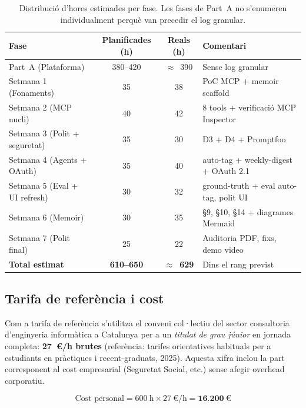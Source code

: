 \begin{table}[H]
    \centerfloat
    \footnotesize
    \caption{Distribució d'hores estimades per fase. Les fases de Part~A no s'enumeren individualment perquè van precedir el log granular.}
    \label{tab:hores-fases}
    \begin{tabular}{@{}lccl@{}}
        \toprule
        Fase & Planificades (h) & Reals (h) & Comentari \\
        \midrule
        Part~A (Plataforma) & 380--420 & $\approx$~390 & Sense log granular \\
        Setmana 1 (Fonaments) & 35 & 38 & PoC MCP + memoir scaffold \\
        Setmana 2 (MCP nucli) & 40 & 42 & 8 tools + verificació MCP Inspector \\
        Setmana 3 (Polit + seguretat) & 35 & 30 & D3 + D4 + Promptfoo \\
        Setmana 4 (Agents + OAuth) & 35 & 40 & auto-tag + weekly-digest + OAuth 2.1 \\
        Setmana 5 (Eval + UI refresh) & 30 & 32 & ground-truth + eval auto-tag, polit UI \\
        Setmana 6 (Memoir) & 30 & 35 & §9, §10, §14 + diagrames Mermaid \\
        Setmana 7 (Polit final) & 25 & 22 & Auditoria PDF, fixs, demo video \\
        \midrule
        \textbf{Total estimat} & \textbf{610--650} & \textbf{$\approx$~629} & Dins el rang previst \\
        \bottomrule
    \end{tabular}
\end{table}

\subsection{Tarifa de referència i cost}

Com a tarifa de referència s'utilitza el conveni col·lectiu del sector consultoria d'enginyeria informàtica a Catalunya per a un \emph{titulat de grau júnior} en jornada completa: \textbf{27~\euro{}/h brutes} (referència: tarifes orientatives habituals per a estudiants en pràctiques i recent-graduats, 2025). Aquesta xifra inclou la part corresponent al cost empresarial (Seguretat Social, etc.) sense afegir overhead corporatiu.

\begin{equation*}
    \text{Cost personal} = 600~\text{h} \times 27~\euro{}/\text{h} = \mathbf{16{.}200~\euro{}}
\end{equation*}

